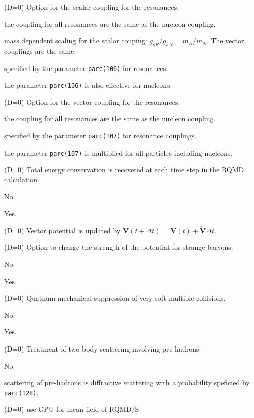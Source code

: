 \documentclass[]{article}
\newenvironment{entry}%
{\begin{list}{}{\setlength{\topsep}{0mm} \setlength{\itemsep}{0mm}
\setlength{\parskip}{0mm} \setlength{\parsep}{0mm}
\setlength{\leftmargin}{20mm} \setlength{\rightmargin}{0mm}
\setlength{\labelwidth}{18mm} \setlength{\labelsep}{2mm}}}%
{\end{list}}
\newenvironment{subentry}%
{\begin{list}{}{\setlength{\topsep}{0mm} \setlength{\itemsep}{0mm}
\setlength{\parskip}{0mm} \setlength{\parsep}{0mm}
\setlength{\leftmargin}{10mm} \setlength{\rightmargin}{0mm}
\setlength{\labelwidth}{18mm} \setlength{\labelsep}{2mm}}}%
{\end{list}}
\newcommand{\ttt}[1]{{\tt#1}}
\newcommand{\itemt}[1]{\item[{\tt #1}\hfill]}
\begin{document}
\begin{entry}
\itemt{mstc(121) :}(D=0) Option for the scalar coupling for the resonances.
 \begin{subentry}
    \itemt{$=0$ :} the coupling for all resonances are the same as the
     nucleon coupling.
    \itemt{$=1$ :} mass dependent scaling for the scalar couping:
    $g_{sR}/g_{sN}=m_R/m_N$. The vector couplings are the same.
    \itemt{$=2$ :} specified by the parameter \ttt{parc(106)} for resonances.
    \itemt{$=3$ :} the parameter \ttt{parc(106)} is also effective for
    nucleons.
 \end{subentry}

\itemt{mstc(122) :}(D=0) Option for the vector coupling for the resonances.
 \begin{subentry}
    \itemt{$=0$ :} the coupling for all resonances are the same as the
     nucleon coupling.
    \itemt{$=1$ :} specified by the parameter \ttt{parc(107)} for resonance
    couplings.
    \itemt{$=2$ :} the parameter \ttt{parc(107)} is multiplied for
    all particles including nucleons.
 \end{subentry}

\itemt{mstc(123) :}(D=0) Total energy conservation 
is recovered at each time step in the RQMD calculation.
 \begin{subentry}
    \itemt{$=0$ :} No.
    \itemt{$=1$ :} Yes.
 \end{subentry}

\itemt{mstc(124) :}(D=0) Vector potential is updated by 
$\bm{V}(t+\Delta t) = \bm{V}(t)+ \bm{\dot{V}}\Delta t$.

\itemt{mstc(125) :}(D=0) Option to change the strength of the potential
for strange baryons.
 \begin{subentry}
    \itemt{$=0$ :} No.
    \itemt{$=1$ :} Yes.
 \end{subentry}


\itemt{mstc(127) :}(D=0) Quatnum-mechanical suppression of very
soft multiple collisions.
 \begin{subentry}
    \itemt{$=0$ :} No.
    \itemt{$=1$ :} Yes.
 \end{subentry}

\itemt{mstc(128) :}(D=0) Treatment of two-body scattering
involving pre-hadrons. 
 \begin{subentry}
    \itemt{$=0$ :} No.
    \itemt{$=1$ :} scattering of pre-hadrons is diffractive scattering
    with a probability speficied by \ttt{parc(128)}.
 \end{subentry}


\itemt{mstc(129) :}(D=0) use GPU for mean field of RQMD/S


\end{entry}
\end{document}
